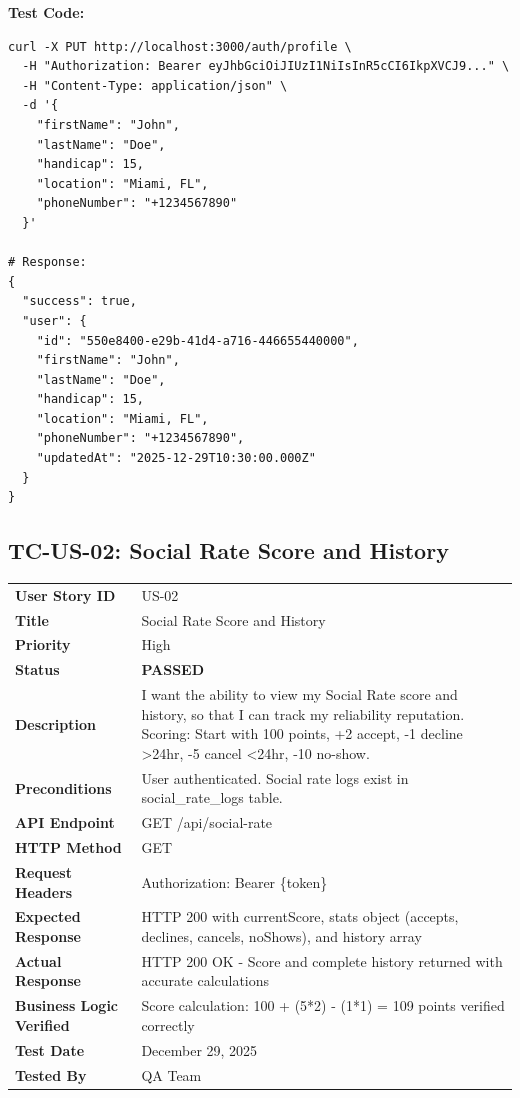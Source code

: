 \documentclass[11pt,a4paper]{article}
\newcommand{\passed}{\textcolor{pass}{\textbf{PASSED}}}
\begin{document}
\vspace{0.3cm}
\textbf{Test Code:}
\begin{lstlisting}
curl -X PUT http://localhost:3000/auth/profile \
  -H "Authorization: Bearer eyJhbGciOiJIUzI1NiIsInR5cCI6IkpXVCJ9..." \
  -H "Content-Type: application/json" \
  -d '{
    "firstName": "John",
    "lastName": "Doe",
    "handicap": 15,
    "location": "Miami, FL",
    "phoneNumber": "+1234567890"
  }'

# Response:
{
  "success": true,
  "user": {
    "id": "550e8400-e29b-41d4-a716-446655440000",
    "firstName": "John",
    "lastName": "Doe",
    "handicap": 15,
    "location": "Miami, FL",
    "phoneNumber": "+1234567890",
    "updatedAt": "2025-12-29T10:30:00.000Z"
  }
}
\end{lstlisting}

\vspace{0.5cm}


\subsection{TC-US-02: Social Rate Score and History}

\begin{tabularx}{\textwidth}{|p{3.2cm}|Y|}
\hline
{}
 \\
\hline
\textbf{User Story ID} & US-02 \\
\hline
\textbf{Title} & Social Rate Score and History \\
\hline
\textbf{Priority} & High \\
\hline
\textbf{Status} & \passed \\
\hline
\textbf{Description} & I want the ability to view my Social Rate score and history, so that I can track my reliability reputation. Scoring: Start with 100 points, +2 accept, -1 decline >24hr, -5 cancel <24hr, -10 no-show. \\
\hline
\textbf{Preconditions} & User authenticated. Social rate logs exist in social\_rate\_logs table. \\
\hline
\textbf{API Endpoint} & GET /api/social-rate \\
\hline
\textbf{HTTP Method} & GET \\
\hline
\textbf{Request Headers} & Authorization: Bearer \{token\} \\
\hline
\textbf{Expected Response} & HTTP 200 with currentScore, stats object (accepts, declines, cancels, noShows), and history array \\
\hline
\textbf{Actual Response} & HTTP 200 OK - Score and complete history returned with accurate calculations \\
\hline
\textbf{Business Logic Verified} & Score calculation: 100 + (5*2) - (1*1) = 109 points verified correctly \\
\hline
\textbf{Test Date} & December 29, 2025 \\
\hline
\textbf{Tested By} & QA Team \\
\hline
\end{tabularx}
\end{document}
